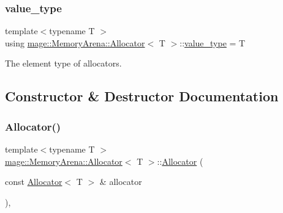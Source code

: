 \mbox{\label{classmage_1_1_memory_arena_1_1_allocator_a216e8ae017f9cfeb1676839da11a1b5c}} 
\subsubsection{\texorpdfstring{value\+\_\+type}{value\_type}}
{\footnotesize\ttfamily template$<$typename T $>$ \\
using \mbox{\hyperlink{classmage_1_1_memory_arena_1_1_allocator}{mage\+::\+Memory\+Arena\+::\+Allocator}}$<$ T $>$\+::\mbox{\hyperlink{classmage_1_1_memory_arena_1_1_allocator_a216e8ae017f9cfeb1676839da11a1b5c}{value\+\_\+type}} =  T}

The element type of allocators. 

\subsection{Constructor \& Destructor Documentation}
\mbox{\label{classmage_1_1_memory_arena_1_1_allocator_a2e2645fcc2598ff377c88859ba153606}} 
\subsubsection{\texorpdfstring{Allocator()}{Allocator()}\hspace{0.1cm}{\footnotesize\ttfamily [1/4]}}
{\footnotesize\ttfamily template$<$typename T $>$ \\
\mbox{\hyperlink{classmage_1_1_memory_arena_1_1_allocator}{mage\+::\+Memory\+Arena\+::\+Allocator}}$<$ T $>$\+::\mbox{\hyperlink{classmage_1_1_memory_arena_1_1_allocator}{Allocator}} (\begin{DoxyParamCaption}\item[{const \mbox{\hyperlink{classmage_1_1_memory_arena_1_1_allocator}{Allocator}}$<$ T $>$ \&}]{allocator }\end{DoxyParamCaption})\hspace{0.3cm}{\ttfamily [default]}, {\ttfamily [noexcept]}}


